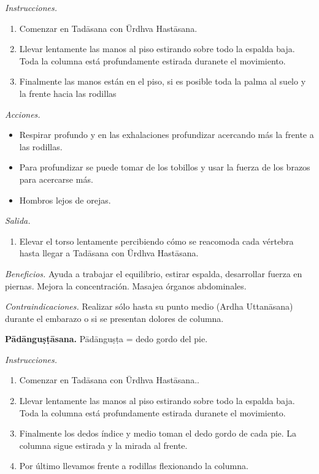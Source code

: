 \emph{Instrucciones.}
\begin{enumerate}
\item Comenzar en Tadāsana con Ūrdhva
Hastāsana.
\item Llevar lentamente las manos al piso
estirando sobre todo la espalda baja. Toda la
columna está profundamente estirada duranete
el movimiento.
\item Finalmente las manos están en el piso,
si es posible toda la palma al suelo y la
frente hacia las rodillas
\end{enumerate}

\emph{Acciones.}
\begin{itemize}
\item Respirar profundo y en las exhalaciones
profundizar acercando más la frente a las
rodillas.
\item Para profundizar se puede tomar de los
tobillos y usar la fuerza de los brazos para
acercarse más.
\item Hombros lejos de orejas.
\end{itemize}

\emph{Salida.}
\begin{enumerate}
\item Elevar el torso lentamente percibiendo
cómo se reacomoda cada vértebra hasta llegar
a Tadāsana con Ūrdhva Hastāsana.
\end{enumerate}

\emph{Beneficios.} Ayuda a trabajar el
equilibrio, estirar espalda, desarrollar
fuerza en piernas. Mejora la concentración.
Masajea órganos abdominales.

\emph{Contraindicaciones.} Realizar sólo
hasta su punto medio (Ardha Uttanāsana)
durante el embarazo o si se presentan dolores
de columna.

\medskip\noindent\textbf{Pādānguṣṭāsana.}
Pādānguṣṭa = dedo gordo del pie.

\emph{Instrucciones.}
\begin{enumerate}
\item Comenzar en Tadāsana con Ūrdhva
Hastāsana..
\item Llevar lentamente las manos al piso
estirando sobre todo la espalda baja. Toda la
columna está profundamente estirada duranete
el movimiento.
\item Finalmente los dedos índice y medio
toman el dedo gordo de cada pie. La columna
sigue estirada y la mirada al frente.
\item Por último llevamos frente a rodillas
flexionando la columna.
\end{enumerate}


